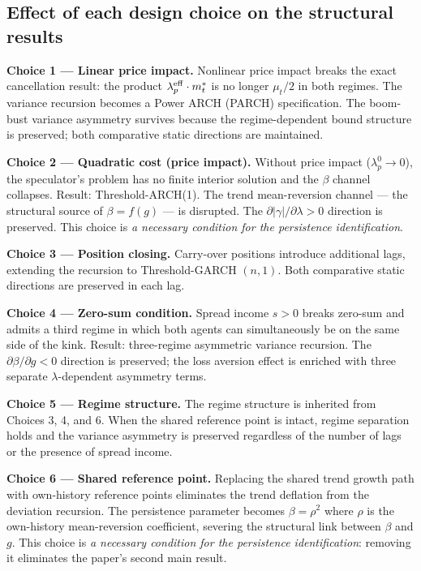 \documentclass[12pt,a4paper]{article}
\theoremstyle{definition}
\begin{document}
\subsection*{Effect of each design choice on the structural results}

\noindent\textbf{Choice 1 --- Linear price impact.} Nonlinear price
impact breaks the exact cancellation result: the product
$\lambda^{\rm eff}_p \cdot m^*_t$ is no longer $\mu_t/2$ in both regimes.
The variance recursion becomes a Power ARCH (PARCH) specification.
The boom-bust variance asymmetry survives because the regime-dependent
bound structure is preserved; both comparative static directions are
maintained.

\noindent\textbf{Choice 2 --- Quadratic cost (price impact).} Without
price impact ($\lambda^0_p \to 0$), the speculator's problem has no
finite interior solution and the $\beta$ channel collapses. Result:
Threshold-ARCH(1). The trend mean-reversion channel --- the
structural source of $\beta = f(g)$ --- is disrupted. The
$\partial|\gamma|/\partial\lambda > 0$ direction is preserved. This
choice is \emph{a necessary condition for the persistence identification}.

\noindent\textbf{Choice 3 --- Position closing.} Carry-over positions
introduce additional lags, extending the recursion to Threshold-GARCH
$(n,1)$. Both comparative static directions are preserved in each lag.

\noindent\textbf{Choice 4 --- Zero-sum condition.} Spread income $s > 0$
breaks zero-sum and admits a third regime in which both agents can
simultaneously be on the same side of the kink. Result: three-regime
asymmetric variance recursion. The $\partial\beta/\partial g < 0$
direction is preserved; the loss aversion effect is enriched with three
separate $\lambda$-dependent asymmetry terms.

\noindent\textbf{Choice 5 --- Regime structure.} The regime structure is
inherited from Choices 3, 4, and 6. When the shared reference point is
intact, regime separation holds and the variance asymmetry is preserved
regardless of the number of lags or the presence of spread income.

\noindent\textbf{Choice 6 --- Shared reference point.} Replacing the
shared trend growth path with own-history reference points eliminates
the trend deflation from the deviation recursion. The
persistence parameter becomes $\beta = \rho^2$ where $\rho$ is the
own-history mean-reversion coefficient, severing the structural link
between $\beta$ and $g$. This choice is \emph{a necessary condition for the
persistence identification}: removing it eliminates the paper's second
main result.
\end{document}
